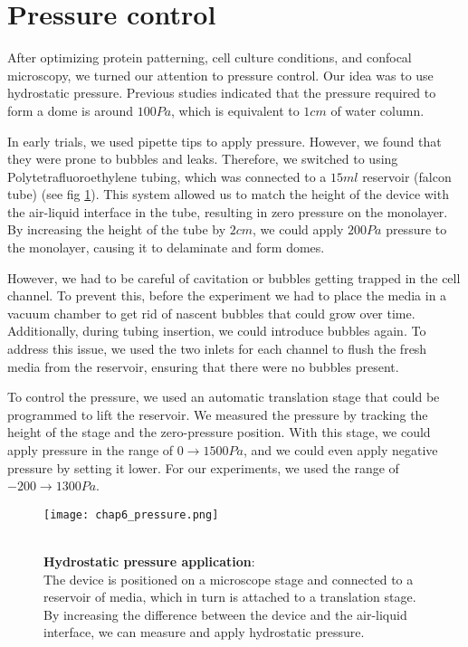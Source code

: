 \hypertarget{pressure-control}{%
\section{Pressure control}\label{pressure-control}}

After optimizing protein patterning, cell culture conditions, and confocal microscopy, we turned our attention to pressure control. Our idea was to use hydrostatic pressure.  Previous studies indicated that the pressure required to form a dome is around $100Pa$, which is equivalent to $1cm$ of water column.

In early trials, we used pipette tips to apply pressure. However, we found that they were prone to bubbles and leaks. Therefore, we switched to using Polytetrafluoroethylene tubing, which was connected to a $15ml$ reservoir (falcon tube) (see fig \ref{fig_6_3}). This system allowed us to match the height of the device with the air-liquid interface in the tube, resulting in zero pressure on the monolayer. By increasing the height of the tube by $2cm$, we could apply $200Pa$ pressure to the monolayer, causing it to delaminate and form domes.  

However, we had to be careful of cavitation or bubbles getting trapped in the cell channel. To prevent this, before the experiment we had to place the media in a vacuum chamber to get rid of nascent bubbles that could grow over time. Additionally, during tubing insertion, we could introduce bubbles again. To address this issue, we used the two inlets for each channel to flush the fresh media from the reservoir, ensuring that there were no bubbles present.  

To control the pressure, we used an automatic translation stage that could be programmed to lift the reservoir. We measured the pressure by tracking the height of the stage and the zero-pressure position. With this stage, we could apply pressure in the range of $0\rightarrow 1500Pa$, and we could even apply negative pressure by setting it lower. For our experiments, we used the range of $-200\rightarrow 1300Pa$.  

\begin{figure}
	\begin{minipage}[c]{0.6\textwidth}
		\texttt{[image: chap6\_pressure.png]}
	\end{minipage}\hfill
	\begin{minipage}[c]{0.35\textwidth}
		\caption{\\ \textbf{Hydrostatic pressure application}:\\ The device is positioned on a microscope stage and connected to a reservoir of media, which in turn is attached to a translation stage. By increasing the difference between the device and the air-liquid interface, we can measure and apply hydrostatic pressure.
		} \label{fig_6_3}
	\end{minipage}
\end{figure}


